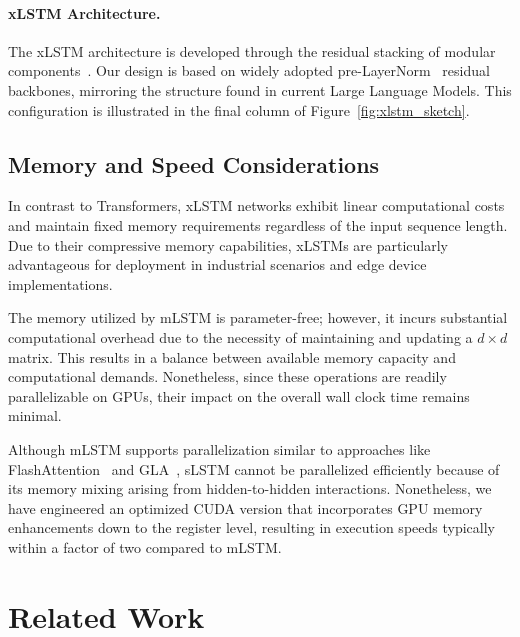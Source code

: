 \paragraph{xLSTM Architecture. }
\label{sec:xLSTMarchitecure}
The xLSTM architecture is developed through the residual stacking of modular components~\citep{Srivastava:15,He:16}. Our design is based on widely adopted pre-LayerNorm~\citep{Ba:16b} residual backbones, mirroring the structure found in current Large Language Models. This configuration is illustrated in the final column of Figure~\ref{fig:xlstm_sketch}.

\subsection{Memory and Speed Considerations}

In contrast to Transformers, xLSTM networks exhibit linear computational costs and maintain fixed memory requirements regardless of the input sequence length. Due to their compressive memory capabilities, xLSTMs are particularly advantageous for deployment in industrial scenarios and edge device implementations.

The memory utilized by mLSTM is parameter-free; however, it incurs substantial computational overhead due to the necessity of maintaining and updating a $d \times d$ matrix. This results in a balance between available memory capacity and computational demands. Nonetheless, since these operations are readily parallelizable on GPUs, their impact on the overall wall clock time remains minimal.

Although mLSTM supports parallelization similar to approaches like FlashAttention~\citep{Dao:22,Dao:23} and GLA~\citep{Yang:23arxiv}, sLSTM cannot be parallelized efficiently because of its memory mixing arising from hidden-to-hidden interactions. Nonetheless, we have engineered an optimized CUDA version that incorporates GPU memory enhancements down to the register level, resulting in execution speeds typically within a factor of two compared to mLSTM.

\section{Related Work}
\label{sec:related}

